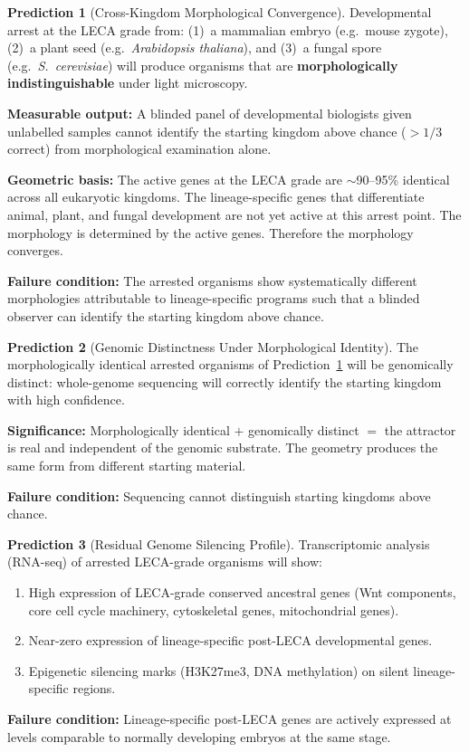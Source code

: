 \documentclass[12pt, a4paper]{article}
\theoremstyle{definition}
\newtheorem{prediction}{Prediction}[section]
\theoremstyle{remark}
\begin{document}
\begin{prediction}[Cross-Kingdom Morphological Convergence]
\label{pred:ckc}
Developmental arrest at the LECA grade from:
(1)~a mammalian embryo (e.g.\ mouse zygote),
(2)~a plant seed (e.g.\ \textit{Arabidopsis thaliana}), and
(3)~a fungal spore (e.g.\ \textit{S.\ cerevisiae})
will produce organisms that are \textbf{morphologically
indistinguishable} under light microscopy.

\textbf{Measurable output:} A blinded panel of developmental
biologists given unlabelled samples cannot identify the
starting kingdom above chance ($> 1/3$ correct) from
morphological examination alone.

\textbf{Geometric basis:} The active genes at the LECA grade
are $\sim$90--95\% identical across all eukaryotic kingdoms.
The lineage-specific genes that differentiate animal, plant,
and fungal development are not yet active at this arrest
point. The morphology is determined by the active genes.
Therefore the morphology converges.

\textbf{Failure condition:} The arrested organisms show
systematically different morphologies attributable to
lineage-specific programs such that a blinded observer can
identify the starting kingdom above chance.
\end{prediction}

\begin{prediction}[Genomic Distinctness Under Morphological
Identity]
The morphologically identical arrested organisms of
Prediction~\ref{pred:ckc} will be genomically distinct:
whole-genome sequencing will correctly identify the starting
kingdom with high confidence.

\textbf{Significance:} Morphologically identical $+$
genomically distinct $=$ the attractor is real and
independent of the genomic substrate. The geometry produces
the same form from different starting material.

\textbf{Failure condition:} Sequencing cannot distinguish
starting kingdoms above chance.
\end{prediction}

\begin{prediction}[Residual Genome Silencing Profile]
Transcriptomic analysis (RNA-seq) of arrested LECA-grade
organisms will show:
\begin{enumerate}[label=(\alph*)]
  \item High expression of LECA-grade conserved ancestral
        genes (Wnt components, core cell cycle machinery,
        cytoskeletal genes, mitochondrial genes).
  \item Near-zero expression of lineage-specific
        post-LECA developmental genes.
  \item Epigenetic silencing marks (H3K27me3, DNA
        methylation) on silent lineage-specific regions.
\end{enumerate}

\textbf{Failure condition:} Lineage-specific post-LECA
genes are actively expressed at levels comparable to
normally developing embryos at the same stage.
\end{prediction}
\end{document}
